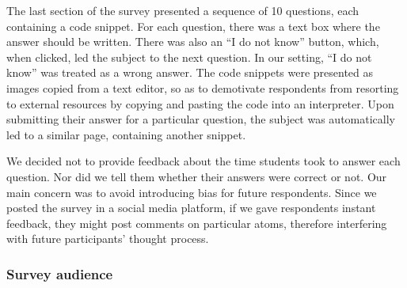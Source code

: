The last section of the survey presented a sequence of 10 questions, each containing a code snippet. For each question, there was a text box where the answer should be written. There was also an ``I do not know'' button, which, when clicked, led the subject to the next question. In our setting, ``I do not know'' was treated as a wrong answer. The code snippets were presented as images copied from a text editor, so as to demotivate respondents from resorting to external resources by copying and pasting the code into an interpreter. Upon submitting their answer for a particular question, the subject was automatically led to a similar page, containing another snippet.
    
We decided not to provide feedback about the time students took to answer each question. Nor did we tell them whether their answers were correct or not. Our main concern was to avoid introducing bias for future respondents. Since we posted the survey in a social media platform, if we gave respondents instant feedback, they might post comments on particular atoms, therefore interfering with future participants' thought process.



\subsubsection*{Survey audience}


